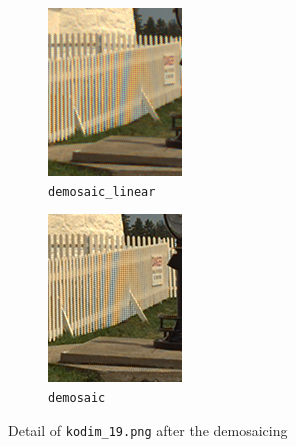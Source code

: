 \documentclass{article}
\newcommand{\inlinecode}[1]{\lstinline[basicstyle=\ttfamily,keywordstyle={}]{#1}}
\begin{document}
\begin{figure}[htbp]
  \centering
  \begin{subfigure}{.5\textwidth}
  \centering
  \includegraphics[width=.8\linewidth]{demosaic_kodim19_artifact}
  \caption{\inlinecode{demosaic_linear}}
\end{subfigure}%
\begin{subfigure}{.5\textwidth}
  \centering
  \includegraphics[width=.8\linewidth]{matlab_demosaic_kodim19_artifact}
  \caption{\inlinecode{demosaic}}
\end{subfigure}
\caption{Detail of \inlinecode{kodim_19.png} after the demosaicing}
\label{fig:artifact}
\end{figure}
\end{document}
